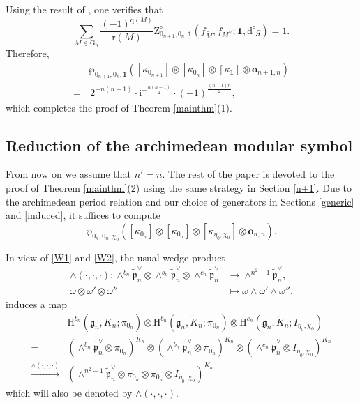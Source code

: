 \documentclass[12pt, a4paper]{amsart}
\newcommand{\RG}{{\mathrm {G}}}
\newcommand{\RH}{{\mathrm {H}}}
\newcommand{\RZ}{{\mathrm {Z}}}
\theoremstyle{Theorem}
\theoremstyle{Theorem}
\theoremstyle{Theorem}
\theoremstyle{Theorem}
\theoremstyle{Plain}
\theoremstyle{Definition}
\begin{document}
	Using the result of \cite[Corollary 2.10]{IM}, one verifies that
	\[
	\sum_{M\in\RG_n}\frac{(-1)^{\mathrm{q}(M)}}{\mathrm{r}(M)}\RZ^{\circ}_{0_{n+1},0_n,\mathbf{1}}\left(f_{\widetilde{M}},f_{M^{\vee}};\mathbf{1},\mathrm{d}^{\circ}g\right)=1.
	\]
	Therefore,
	\[
	\begin{aligned}
		&\wp_{0_{n+1},0_n,\mathbf{1}}\left([\kappa_{0_{n+1}}]\otimes[\kappa_{0_n}]\otimes[\kappa_{\mathbf{1}}]\otimes\mathbf{o}_{n+1,n}\right)\\
		=&\,2^{-n(n+1)}\cdot\mathrm{i}^{-\frac{n(n-1)}{2}}\cdot(-1)^{\frac{(n+1)n}{2}},
	\end{aligned}
	\]
	which completes the proof of Theorem \ref{mainthm}(1).
	
	\subsection{Reduction of the archimedean modular symbol}\label{sec:4.2}
	
	From now on we assume that $n'=n$. The rest of the paper is devoted to the proof of Theorem \ref{mainthm}(2) using the same strategy in Section \ref{n+1}. Due to the archimedean period relation \cite[Theorem 1.6]{JLSa} and our choice of generators in Sections \ref{generic} and \ref{induced}, it suffices to compute
	\[
	\wp_{0_n,0_n,\chi_0}\left([\kappa_{0_n}]\otimes[\kappa_{0_n}]\otimes[\kappa_{\eta_0,\chi_0}]\otimes\mathbf{o}_{n,n}\right).
	\]
	
	In view of \eqref{W1} and \eqref{W2}, the usual wedge product
	\[
	\begin{aligned}
		\wedge(\cdot,\cdot,\cdot):\wedge^{b_n}\widetilde{\mathfrak{p}}_n^{\vee}\otimes\wedge^{b_n}\widetilde{\mathfrak{p}}_n^{\vee}\otimes\wedge^{c_n}\widetilde{\mathfrak{p}}_n^{\vee}&\to\wedge^{n^2-1}\widetilde{\mathfrak{p}}_n^{\vee},\\
		\omega\otimes\omega'\otimes\omega''&\mapsto\omega\wedge\omega'\wedge\omega''.
	\end{aligned}
	\]
	induces a map
	\[
	\begin{aligned}
		&\RH^{b_{n}}(\mathfrak{g}_{n},\widetilde{K}_{n};\pi_{0_{n}})\otimes\RH^{b_{n}}(\mathfrak{g}_{n},\widetilde{K}_{n};\pi_{0_{n}})\otimes\RH^{c_{n}}(\mathfrak{g}_{n},\widetilde{K}_{n};I_{\eta_0,\chi_0})\\
		=&\left(\wedge^{b_n}\widetilde{\mathfrak{p}}_n^{\vee}\otimes\pi_{0_n}\right)^{K_n}\otimes\left(\wedge^{b_n}\widetilde{\mathfrak{p}}_n^{\vee}\otimes\pi_{0_n}\right)^{K_n}\otimes\left(\wedge^{c_n}\widetilde{\mathfrak{p}}_n^{\vee}\otimes I_{\eta_0,\chi_0}\right)^{K_n}\\
		\xrightarrow{\wedge(\cdot,\cdot,\cdot)}&\left(\wedge^{n^2-1}\widetilde{\mathfrak{p}}_n^{\vee}\otimes\pi_{0_n}\otimes\pi_{0_n}\otimes I_{\eta_0,\chi_0}\right)^{K_n}
	\end{aligned}
	\]
	which will also be denoted by $\wedge(\cdot,\cdot,\cdot)$.
	
\end{document}
